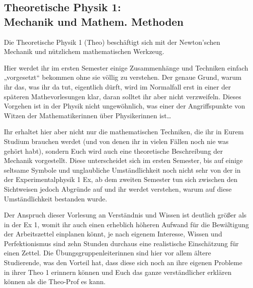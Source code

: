 \subsection{Theoretische Physik 1: \\Mechanik und Mathem. Methoden}
\label{theo1}
Die Theoretische Physik 1 (\gls{Theo}) beschäftigt sich mit der Newton'schen Mechanik und nützlichem mathematischen Werkzeug.

Hier werdet ihr im ersten Semester einige Zusammenhänge und Techniken einfach „vorgesetzt“ bekommen ohne sie völlig zu verstehen. Der genaue Grund, warum ihr das, was ihr da tut, eigentlich dürft, wird im Normalfall erst in einer der späteren Mathevorlesungen klar, daran solltet ihr aber nicht verzweifeln. Dieses Vorgehen ist in der Physik nicht ungewöhnlich, was einer der Angriffspunkte von Witzen der Mathematikerinnen über Physikerinnen ist\dots

Ihr erhaltet hier aber nicht nur die mathematischen Techniken, die ihr in Eurem Studium brauchen werdet (und von denen ihr in vielen Fällen noch nie was gehört habt), sondern Euch wird auch eine theoretische Beschreibung der Mechanik vorgestellt. Diese unterscheidet sich im ersten Semester, bis auf einige seltsame Symbole und unglaubliche Umständlichkeit noch nicht sehr von der in der Experimentalphysik 1 \gls{Ex}, ab dem zweiten Semester tun sich zwischen den Sichtweisen jedoch Abgründe auf und ihr werdet verstehen, warum auf diese Umständlichkeit bestanden wurde.

Der Anspruch dieser Vorlesung an Verständnis und Wissen ist deutlich größer als in der Ex 1, womit ihr auch einen erheblich höheren Aufwand für die Bewältigung der Arbeitszettel einplanen könnt, je nach eigenem Interesse, Wissen und Perfektionismus sind zehn Stunden durchaus eine realistische Einschätzung für einen Zettel. Die Übungsgruppenleiterinnen sind hier vor allem ältere Studierende, was den Vorteil hat, dass diese sich noch an ihre eigenen Probleme in ihrer Theo 1 erinnern können und Euch das ganze verständlicher erklären können als die Theo-Prof es kann.

\vfill
\begin{figure}[hbt]
\end{figure}
